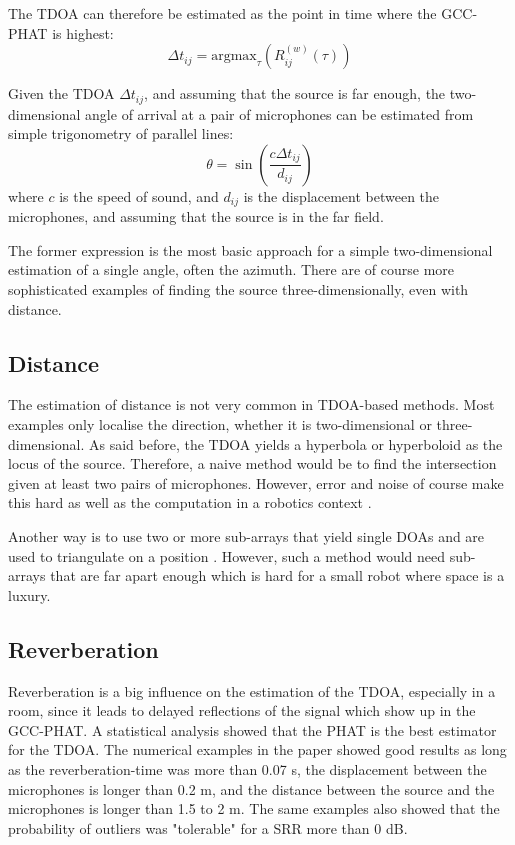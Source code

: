 \documentclass[notitlepage]{report}
\begin{document}
The TDOA can therefore be estimated as the point in time where the GCC-PHAT is highest:
\begin{equation}
\Delta t_{ij} = \text{argmax}_\tau \left( R^{(w)}_{ij} (\tau) \right)
\end{equation}

Given the TDOA $\Delta t_{ij}$, and assuming that the source is far enough, the two-dimensional angle of arrival at a pair of microphones can be estimated from simple trigonometry of parallel lines:
\begin{equation}
\theta = \sin\left( \frac{c\Delta t_{ij}}{d_{ij}} \right)
\end{equation}
where $c$ is the speed of sound, and $d_{ij}$ is the displacement between the microphones, and assuming that the source is in the far field.

The former expression is the most basic approach for a simple two-dimensional estimation of a single angle, often the azimuth. There are of course more sophisticated examples of finding the source three-dimensionally, even with distance.

\subsection{Distance}

The estimation of distance is not very common in TDOA-based methods. Most examples only localise the direction, whether it is two-dimensional or three-dimensional. As said before, the TDOA yields a hyperbola or hyperboloid as the locus of the source. Therefore, a naive method would be to find the intersection given at least two pairs of microphones. However, error and noise of course make this hard as well as the computation in a robotics context \cite{rascon_localization_2017}.

Another way is to use two or more sub-arrays that yield single DOAs and are used to triangulate on a position \cite{rascon_localization_2017}. However, such a method would need sub-arrays that are far apart enough which is hard for a small robot where space is a luxury.

\subsection{Reverberation}

Reverberation is a big influence on the estimation of the TDOA, especially in a room, since it leads to delayed reflections of the signal which show up in the GCC-PHAT. A statistical analysis \cite{gustafsson_source_2003} showed that the PHAT is the best estimator for the TDOA. The numerical examples in the paper showed good results as long as the reverberation-time was more than 0.07 \si{s}, the displacement between the microphones is longer than 0.2 \si{m}, and the distance between the source and the microphones is longer than 1.5 to 2 \si{m}. The same examples also showed that the probability of outliers was "tolerable" for a SRR more than 0 \si{dB}.
\end{document}
